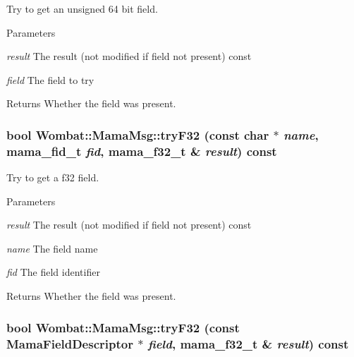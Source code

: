 Try to get an unsigned 64 bit field. 
\begin{DoxyParams}{Parameters}
\item[{\em result}]The result (not modified if field not present) const \item[{\em field}]The field to try \end{DoxyParams}
\begin{DoxyReturn}{Returns}
Whether the field was present. 
\end{DoxyReturn}
\hypertarget{classWombat_1_1MamaMsg_a51cbc48817fbdc8bf85a004ffe926f3a}{
\subsubsection[{tryF32}]{\setlength{\rightskip}{0pt plus 5cm}bool Wombat::MamaMsg::tryF32 (const char $\ast$ {\em name}, \/  mama\_\-fid\_\-t {\em fid}, \/  mama\_\-f32\_\-t \& {\em result}) const}}
\label{classWombat_1_1MamaMsg_a51cbc48817fbdc8bf85a004ffe926f3a}


Try to get a f32 field. 
\begin{DoxyParams}{Parameters}
\item[{\em result}]The result (not modified if field not present) const \item[{\em name}]The field name \item[{\em fid}]The field identifier \end{DoxyParams}
\begin{DoxyReturn}{Returns}
Whether the field was present. 
\end{DoxyReturn}
\hypertarget{classWombat_1_1MamaMsg_ada8ad2dd3f82346e585af21033ea9298}{
\subsubsection[{tryF32}]{\setlength{\rightskip}{0pt plus 5cm}bool Wombat::MamaMsg::tryF32 (const {\bf MamaFieldDescriptor} $\ast$ {\em field}, \/  mama\_\-f32\_\-t \& {\em result}) const}}
\label{classWombat_1_1MamaMsg_ada8ad2dd3f82346e585af21033ea9298}


